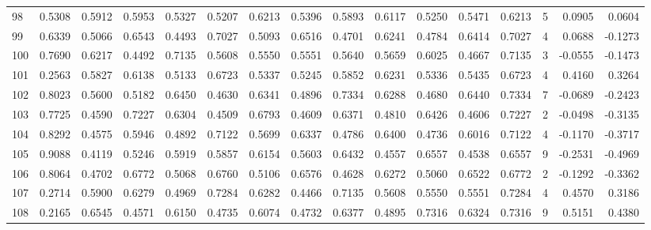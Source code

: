 \begin{tabular}{lrrrrrrrrrrrrrrr}
98  &      0.5308 &  0.5912 &  0.5953 &  0.5327 &  0.5207 &  0.6213 &  0.5396 &  0.5893 &  0.6117 &  0.5250 &   0.5471 &     0.6213 &      5 &                    0.0905 &                     0.0604 \\
99  &      0.6339 &  0.5066 &  0.6543 &  0.4493 &  0.7027 &  0.5093 &  0.6516 &  0.4701 &  0.6241 &  0.4784 &   0.6414 &     0.7027 &      4 &                    0.0688 &                    -0.1273 \\
100 &      0.7690 &  0.6217 &  0.4492 &  0.7135 &  0.5608 &  0.5550 &  0.5551 &  0.5640 &  0.5659 &  0.6025 &   0.4667 &     0.7135 &      3 &                   -0.0555 &                    -0.1473 \\
101 &      0.2563 &  0.5827 &  0.6138 &  0.5133 &  0.6723 &  0.5337 &  0.5245 &  0.5852 &  0.6231 &  0.5336 &   0.5435 &     0.6723 &      4 &                    0.4160 &                     0.3264 \\
102 &      0.8023 &  0.5600 &  0.5182 &  0.6450 &  0.4630 &  0.6341 &  0.4896 &  0.7334 &  0.6288 &  0.4680 &   0.6440 &     0.7334 &      7 &                   -0.0689 &                    -0.2423 \\
103 &      0.7725 &  0.4590 &  0.7227 &  0.6304 &  0.4509 &  0.6793 &  0.4609 &  0.6371 &  0.4810 &  0.6426 &   0.4606 &     0.7227 &      2 &                   -0.0498 &                    -0.3135 \\
104 &      0.8292 &  0.4575 &  0.5946 &  0.4892 &  0.7122 &  0.5699 &  0.6337 &  0.4786 &  0.6400 &  0.4736 &   0.6016 &     0.7122 &      4 &                   -0.1170 &                    -0.3717 \\
105 &      0.9088 &  0.4119 &  0.5246 &  0.5919 &  0.5857 &  0.6154 &  0.5603 &  0.6432 &  0.4557 &  0.6557 &   0.4538 &     0.6557 &      9 &                   -0.2531 &                    -0.4969 \\
106 &      0.8064 &  0.4702 &  0.6772 &  0.5068 &  0.6760 &  0.5106 &  0.6576 &  0.4628 &  0.6272 &  0.5060 &   0.6522 &     0.6772 &      2 &                   -0.1292 &                    -0.3362 \\
107 &      0.2714 &  0.5900 &  0.6279 &  0.4969 &  0.7284 &  0.6282 &  0.4466 &  0.7135 &  0.5608 &  0.5550 &   0.5551 &     0.7284 &      4 &                    0.4570 &                     0.3186 \\
108 &      0.2165 &  0.6545 &  0.4571 &  0.6150 &  0.4735 &  0.6074 &  0.4732 &  0.6377 &  0.4895 &  0.7316 &   0.6324 &     0.7316 &      9 &                    0.5151 &                     0.4380 \\

\end{tabular}
